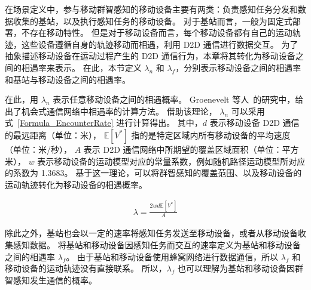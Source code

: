 在场景定义中，参与移动群智感知的移动设备主要有两类：负责感知任务分发和数据收集的基站，以及执行感知任务的移动设备。
对于基站而言，一般为固定式部署，不存在移动特性。
但是对于移动设备而言，每个移动设备都有自己的运动轨迹，这些设备遵循自身的轨迹移动而相遇，利用 D2D 通信进行数据交互。
为了抽象描述移动设备在运动过程产生的 D2D 通信行为，本章将其转化为移动设备之间的相遇率来表示。
在此，本节定义 $\lambda_n$ 和 $\lambda_f$，分别表示移动设备之间的相遇率和基站与移动设备之间的相遇率。

在此，用 $\lambda_n$ 表示任意移动设备之间的相遇概率。
Groenevelt 等人~\cite{DBLP:journals/pe/GroeneveltNK05}的研究中，给出了机会式通信网络中相遇率的计算方法。
借助该理论， $\lambda_n$ 可以采用式~\eqref{Formula_EncounterRate} 进行计算得出。
其中，$d$ 表示移动设备 D2D 通信的最远距离（单位：米），
$\mathbb{E}[V^*]$ 指的是特定区域内所有移动设备的平均速度（单位：米/秒），
$A$ 表示 D2D 通信网络中所期望的覆盖区域面积（单位：平方米），
$w$ 表示移动设备的运动模型对应的常量系数，例如随机路径运动模型所对应的系数为 1.3683。
基于这一理论，可以将群智感知的覆盖范围、以及移动设备的运动轨迹转化为移动设备的相遇概率。

\begin{equation}
  \label{Formula_EncounterRate}
  \begin{gathered}
  \lambda = \frac{2 w d \mathbb{E}[V^*]}{A}
  \end{gathered}
\end{equation}

除此之外，基站也会以一定的速率将感知任务发送至移动设备，或者从移动设备收集感知数据。
将基站和移动设备因感知任务而交互的速率定义为基站和移动设备之间的相遇率 $\lambda_f$。
由于基站和移动设备使用蜂窝网络进行数据通信，所以 $\lambda_f$ 和移动设备的运动轨迹没有直接联系。
所以，$\lambda_f$ 也可以理解为基站和移动设备因群智感知发生通信的概率。






